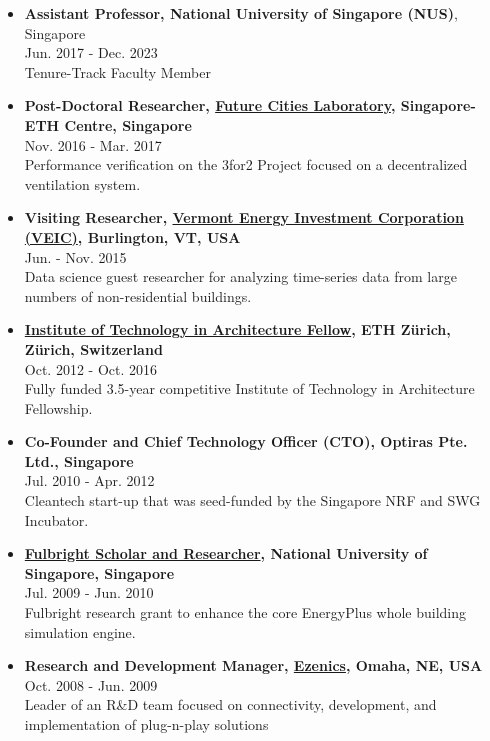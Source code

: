 \documentclass[10pt,a4paper]{article}
\begin{document}
\begin{small}
\begin{itemize}
\item 
{\bf Assistant Professor, National University of Singapore (NUS)}, Singapore\\
Jun. 2017 - Dec. 2023\\
Tenure-Track Faculty Member

\item 
{\bf Post-Doctoral Researcher, \href{https://fcl.ethz.ch}{Future Cities Laboratory}, Singapore-ETH Centre, Singapore}\\
Nov. 2016 - Mar. 2017\\
Performance verification on the 3for2 Project focused on a decentralized ventilation system.

\item {\bf Visiting Researcher, \href{https://www.veic.org}{Vermont Energy Investment Corporation (VEIC)}, Burlington, VT, USA}\\ 
Jun. - Nov. 2015\\
Data science guest researcher for analyzing time-series data from large numbers of non-residential buildings.

\item {\bf \href{https://ita.arch.ethz.ch/Doctoral-Program/a-t-phd-fellows.html}{Institute of Technology in Architecture Fellow}, ETH Z\"urich, Z\"urich, Switzerland}\\
Oct. 2012 - Oct. 2016\\
Fully funded 3.5-year competitive Institute of Technology in Architecture Fellowship. 

\item {\bf Co-Founder and Chief Technology Officer (CTO), Optiras Pte. Ltd., Singapore}\\ 
Jul. 2010 - Apr. 2012\\
Cleantech start-up that was seed-funded by the Singapore NRF and SWG Incubator. 

\item {\bf \href{https://fulbrightscholars.org}{Fulbright Scholar and Researcher}, National University of Singapore, Singapore}\\
Jul. 2009 - Jun. 2010\\
Fulbright research grant to enhance the core EnergyPlus whole building simulation engine.

\item {\bf Research and Development Manager, \href{https://www.ezenics.com}{Ezenics}, Omaha, NE, USA}\\
Oct. 2008 - Jun. 2009\\
Leader of an R\&D team focused on connectivity, development, and implementation of plug-n-play solutions


\end{itemize}
\end{small}
\end{document}
